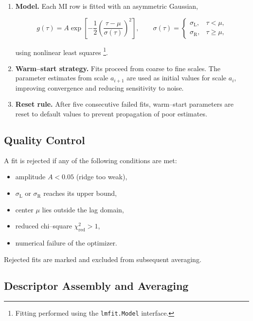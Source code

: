 \documentclass[pdflatex,sn-mathphys-num]{sn-jnl}%
\theoremstyle{thmstyleone}%
\theoremstyle{thmstyletwo}%
\theoremstyle{thmstylethree}%
\begin{document}
\begin{enumerate}
    \item \textbf{Model.}  
   Each MI row is fitted with an asymmetric Gaussian,
   

\[
   g(\tau) = A \exp\!\left[-\frac{1}{2}
   \left(\frac{\tau - \mu}{\sigma(\tau)}\right)^2\right],
   \qquad
   \sigma(\tau) =
   \begin{cases}
   \sigma_{\mathrm{L}}, & \tau < \mu,\\
   \sigma_{\mathrm{R}}, & \tau \ge \mu,
   \end{cases}
   \]


   using nonlinear least squares%
   \footnote{Fitting performed using the \texttt{lmfit.Model} interface.}.
   \item \textbf{Warm–start strategy.}  
   Fits proceed from coarse to fine scales.  
   The parameter estimates from scale $a_{i+1}$ are used as initial values for
   scale $a_i$, improving convergence and reducing sensitivity to noise.

   \item \textbf{Reset rule.}  
   After five consecutive failed fits, warm–start parameters are reset to
   default values to prevent propagation of poor estimates.

\end{enumerate}

\subsection{Quality Control}

A fit is rejected if any of the following conditions are met:

\begin{itemize}
    \item amplitude $A < 0.05$ (ridge too weak),
    \item $\sigma_{\mathrm{L}}$ or $\sigma_{\mathrm{R}}$ reaches its upper bound,
    \item center $\mu$ lies outside the lag domain,
    \item reduced chi–square $\chi^2_{\mathrm{red}} > 1$,
    \item numerical failure of the optimizer.
\end{itemize}
Rejected fits are marked and excluded from subsequent averaging.

\subsection{Descriptor Assembly and Averaging}
\end{document}
